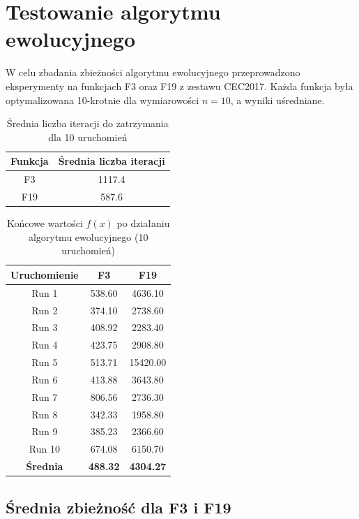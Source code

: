 \documentclass[a4paper]{article}
\begin{document}
\section{Testowanie algorytmu ewolucyjnego}

W celu zbadania zbieżności algorytmu ewolucyjnego przeprowadzono eksperymenty na funkcjach F3 oraz F19 z zestawu CEC2017.  
Każda funkcja była optymalizowana 10-krotnie dla wymiarowości \(n=10\), a wyniki uśredniane.  


\begin{table}[H]
\centering
\begin{tabular}{|c|c|}
\hline
\textbf{Funkcja} & \textbf{Średnia liczba iteracji} \\\hline
F3 & 1117.4 \\\hline
F19 & 587.6 \\\hline
\end{tabular}
\caption{Średnia liczba iteracji do zatrzymania dla 10 uruchomień}
\end{table}


\begin{table}[H]
\centering
\begin{tabular}{|c|c|c|}
\hline
\textbf{Uruchomienie} & \textbf{F3} & \textbf{F19} \\\hline
Run 1 & 538.60 & 4636.10 \\\hline
Run 2 & 374.10 & 2738.60 \\\hline
Run 3 & 408.92 & 2283.40 \\\hline
Run 4 & 423.75 & 2908.80 \\\hline
Run 5 & 513.71 & 15420.00 \\\hline
Run 6 & 413.88 & 3643.80 \\\hline
Run 7 & 806.56 & 2736.30 \\\hline
Run 8 & 342.33 & 1958.80 \\\hline
Run 9 & 385.23 & 2366.60 \\\hline
Run 10 & 674.08 & 6150.70 \\\hline
\textbf{Średnia} & \textbf{488.32} & \textbf{4304.27} \\\hline
\end{tabular}
\caption{Końcowe wartości \(f(x)\) po działaniu algorytmu ewolucyjnego (10 uruchomień)}
\end{table}

\subsection{Średnia zbieżność dla F3 i F19}
\end{document}
